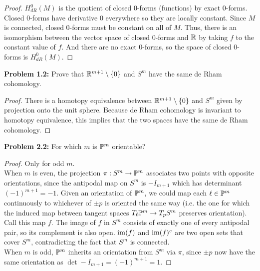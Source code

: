 \documentclass{amsart}
\begin{document}
	\begin{proof}
		$H_{dR}^0(M)$ is the quotient of closed $0$-forms (functions) by exact $0$-forms. Closed 0-forms have derivative 0 everywhere so they are locally constant. Since $M$ is connected, closed 0-forms must be constant on all of $M$. Thus, there is an isomorphism between the vector space of closed 0-forms and $\R$ by taking $f$ to the constant value of $f$. And there are no exact 0-forms, so the space of closed 0-forms is $H_{dR}^0(M)$.
	\end{proof}
	
	\newpage 
	
	\textbf{Problem 1.2:} Prove that $\R^{m+1}\setminus \{0\}$ and $S^m$ have the same de Rham cohomology.
	
	\begin{proof}
		There is a homotopy equivalence between $\R^{m+1}\setminus \{0\}$ and $S^m$ given by projection onto the unit sphere. Because de Rham cohomology is invariant to homotopy equivalence, this implies that the two spaces have the same de Rham cohomology.
	\end{proof}
	
	\newpage 
	
	\textbf{Problem 2.2:} For which $m$ is $\P^m$ orientable?
	\begin{proof}
		Only for odd $m$.\\
		
		When $m$ is even, the projection $\pi:S^m\to \P^m$ associates two points with opposite orientations, since the antipodal map on $S^m$ is $-I_{m+1}$ which has determinant $(-1)^{m+1}=-1$. Given an orientation of $\P^m$, we could map each $\ell \in \P^m$ continuously to whichever of $\pm p$ is oriented the same way (i.e. the one for which the induced map between tangent spaces $T_{\ell}\P^m\to T_p S^m$ preserves orientation). Call this map $f$. The image of $f$ in $S^m$ consists of exactly one of every antipodal pair, so its complement is also open. $\im(f)$ and $\im(f)^c$ are two open sets that cover $S^m$, contradicting the fact that $S^m$ is connected. \\
		
		When $m$ is odd, $\P^m$ inherits an orientation from $S^m$ via $\pi$, since $\pm p$ now have the same orientation as $\det -I_{m+1} = (-1)^{m+1}=1$.
	\end{proof}
	
\end{document}
